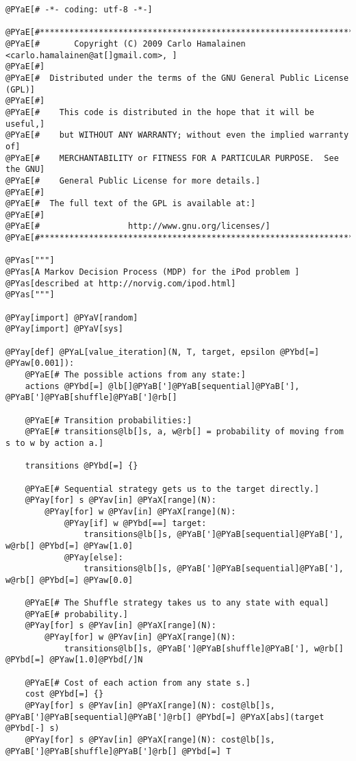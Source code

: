 \begin{Verbatim}[commandchars=@\[\]]
@PYaE[# -*- coding: utf-8 -*-]

@PYaE[#*****************************************************************************]
@PYaE[#       Copyright (C) 2009 Carlo Hamalainen <carlo.hamalainen@at[]gmail.com>, ]
@PYaE[#]
@PYaE[#  Distributed under the terms of the GNU General Public License (GPL)]
@PYaE[#]
@PYaE[#    This code is distributed in the hope that it will be useful,]
@PYaE[#    but WITHOUT ANY WARRANTY; without even the implied warranty of]
@PYaE[#    MERCHANTABILITY or FITNESS FOR A PARTICULAR PURPOSE.  See the GNU]
@PYaE[#    General Public License for more details.]
@PYaE[#]
@PYaE[#  The full text of the GPL is available at:]
@PYaE[#]
@PYaE[#                  http://www.gnu.org/licenses/]
@PYaE[#*****************************************************************************]

@PYas["""]
@PYas[A Markov Decision Process (MDP) for the iPod problem ]
@PYas[described at http://norvig.com/ipod.html]
@PYas["""]

@PYay[import] @PYaV[random]
@PYay[import] @PYaV[sys]

@PYay[def] @PYaL[value_iteration](N, T, target, epsilon @PYbd[=] @PYaw[0.001]):
    @PYaE[# The possible actions from any state:]
    actions @PYbd[=] @lb[]@PYaB[']@PYaB[sequential]@PYaB['], @PYaB[']@PYaB[shuffle]@PYaB[']@rb[]

    @PYaE[# Transition probabilities:]
    @PYaE[# transitions@lb[]s, a, w@rb[] = probability of moving from s to w by action a.]

    transitions @PYbd[=] {}

    @PYaE[# Sequential strategy gets us to the target directly.]
    @PYay[for] s @PYav[in] @PYaX[range](N):
        @PYay[for] w @PYav[in] @PYaX[range](N):
            @PYay[if] w @PYbd[==] target:
                transitions@lb[]s, @PYaB[']@PYaB[sequential]@PYaB['], w@rb[] @PYbd[=] @PYaw[1.0]
            @PYay[else]:
                transitions@lb[]s, @PYaB[']@PYaB[sequential]@PYaB['], w@rb[] @PYbd[=] @PYaw[0.0]

    @PYaE[# The Shuffle strategy takes us to any state with equal]
    @PYaE[# probability.]
    @PYay[for] s @PYav[in] @PYaX[range](N):
        @PYay[for] w @PYav[in] @PYaX[range](N):
            transitions@lb[]s, @PYaB[']@PYaB[shuffle]@PYaB['], w@rb[] @PYbd[=] @PYaw[1.0]@PYbd[/]N

    @PYaE[# Cost of each action from any state s.]
    cost @PYbd[=] {}
    @PYay[for] s @PYav[in] @PYaX[range](N): cost@lb[]s, @PYaB[']@PYaB[sequential]@PYaB[']@rb[] @PYbd[=] @PYaX[abs](target @PYbd[-] s)
    @PYay[for] s @PYav[in] @PYaX[range](N): cost@lb[]s, @PYaB[']@PYaB[shuffle]@PYaB[']@rb[] @PYbd[=] T


\end{Verbatim}
